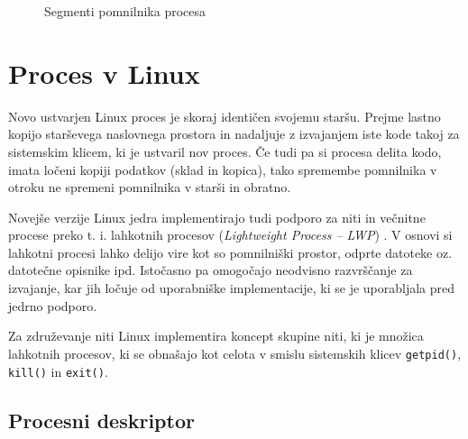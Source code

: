 \documentclass[a4paper,12pt,openright]{book}
\begin{document}
\begin{figure}[h!]
	\begin{center}
	\end{center}
	\caption{Segmenti pomnilnika procesa \cite{Silberschatz_Galvin_Gagne_2018}}
	\label{fig:process_memory_segments}
\end{figure}

\section{Proces v Linux}

Novo ustvarjen Linux proces je skoraj identičen svojemu staršu.
Prejme lastno kopijo starševega naslovnega prostora in nadaljuje z izvajanjem iste kode takoj za sistemskim klicem, ki je ustvaril nov proces.
Če tudi pa si procesa delita kodo, imata ločeni kopiji podatkov (sklad in kopica), tako spremembe pomnilnika v otroku ne spremeni pomnilnika v starši in obratno.

Novejše verzije Linux jedra implementirajo tudi podporo za niti in večnitne procese preko t. i. lahkotnih procesov (\textit{Lightweight Process -- LWP}) \cite{Bovet_Cesati_2005}.
V osnovi si lahkotni procesi lahko delijo vire kot so pomnilniški prostor, odprte datoteke oz. datotečne opisnike ipd.
Istočasno pa omogočajo neodvisno razvrščanje za izvajanje, kar jih ločuje od uporabniške implementacije, ki se je uporabljala pred jedrno podporo.

Za združevanje niti Linux implementira koncept skupine niti, ki je množica lahkotnih procesov, ki se obnašajo kot celota v smislu sistemskih klicev \texttt{getpid()}, \texttt{kill()} in \texttt{exit()}.

\subsection{Procesni deskriptor}
\end{document}
